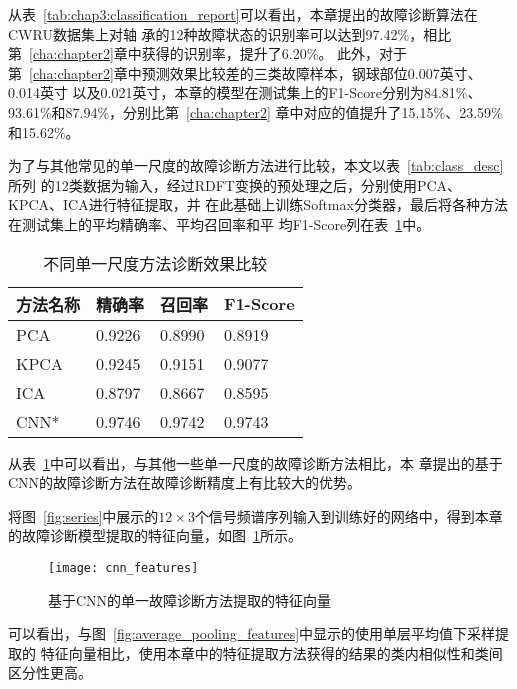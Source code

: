 从表~\ref{tab:chap3:classification_report}可以看出，本章提出的故障诊断算法在CWRU数据集上对轴
承的12种故障状态的识别率可以达到97.42\%，相比第~\ref{cha:chapter2}章中获得的识别率，提升了6.20\%。
此外，对于第~\ref{cha:chapter2}章中预测效果比较差的三类故障样本，钢球部位0.007英寸、0.014英寸
以及0.021英寸，本章的模型在测试集上的F1-Score分别为84.81\%、93.61\%和87.94\%，分别比第~\ref{cha:chapter2}
章中对应的值提升了15.15\%、23.59\%和15.62\%。

为了与其他常见的单一尺度的故障诊断方法进行比较，本文以表~\ref{tab:class_desc}所列
的12类数据为输入，经过RDFT变换的预处理之后，分别使用PCA、KPCA、ICA进行特征提取，并
在此基础上训练Softmax分类器，最后将各种方法在测试集上的平均精确率、平均召回率和平
均F1-Score列在表~\ref{tab:chap3:comparison}中。
\begin{table}[htb]
  \centering
  \begin{minipage}[t]{0.8\linewidth}
  \caption{不同单一尺度方法诊断效果比较}
  \label{tab:chap3:comparison}
    \begin{tabularx}{\linewidth}{XXXX}
      \toprule[1.5pt]
        方法名称 & 精确率 & 召回率 & F1-Score \\
      \midrule[1pt]
        PCA      & 0.9226 & 0.8990 & 0.8919 \\
        KPCA     & 0.9245 & 0.9151 & 0.9077 \\
        ICA      & 0.8797 & 0.8667 & 0.8595 \\
        CNN*     & 0.9746 & 0.9742 & 0.9743  \\
      \bottomrule[1.5pt]
    \end{tabularx}
  \end{minipage}
\end{table}

从表~\ref{tab:chap3:comparison}中可以看出，与其他一些单一尺度的故障诊断方法相比，本
章提出的基于CNN的故障诊断方法在故障诊断精度上有比较大的优势。

将图~\ref{fig:series}中展示的$12\times 3$个信号频谱序列输入到训练好的网络中，得到本章
的故障诊断模型提取的特征向量，如图~\ref{fig:cnn_features}所示。
\begin{figure}[ht]
  \centering%
  \texttt{[image: cnn\_features]}
  \caption{基于CNN的单一故障诊断方法提取的特征向量}
  \label{fig:cnn_features}
\end{figure}

可以看出，与图~\ref{fig:average_pooling_features}中显示的使用单层平均值下采样提取的
特征向量相比，使用本章中的特征提取方法获得的结果的类内相似性和类间区分性更高。

